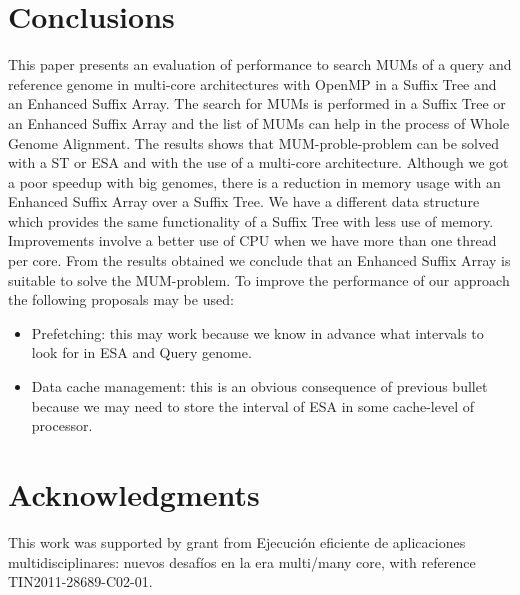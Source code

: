 \documentclass{acm_proc_article-sp}
\begin{document}
\section{Conclusions}
This paper presents an evaluation of performance to search MUMs of a query and reference genome in multi-core architectures with OpenMP in a Suffix Tree and an Enhanced Suffix Array. The search for MUMs is performed in a Suffix Tree or an Enhanced Suffix Array and the list of MUMs can help in the process of Whole Genome Alignment. The results shows that MUM-proble-problem can be solved with a ST or ESA and with the use of a multi-core architecture. Although we got a poor speedup with big genomes, there is a reduction in memory usage with an Enhanced Suffix Array over a Suffix Tree. We have a different data structure which provides the same functionality of a Suffix Tree with less use of memory.\\
Improvements involve a better use of CPU when we have more than one thread per core. From the results obtained we conclude that an Enhanced Suffix Array is suitable to solve the MUM-problem. To improve the performance of our approach the following proposals may be used:
\begin{itemize}
  \item Prefetching: this may work because we know in advance what intervals to look for in ESA and Query genome. 
  \item Data cache management: this is an obvious consequence of previous bullet because we may need to store the interval of ESA in some cache-level of processor.
\end{itemize}

\section{Acknowledgments}
This work was supported by grant from Ejecuci\'on eficiente de aplicaciones multidisciplinares: nuevos desaf\'ios en la era multi/many core, with reference TIN2011-28689-C02-01.
%

%
%
\balancecolumns
\end{document}

